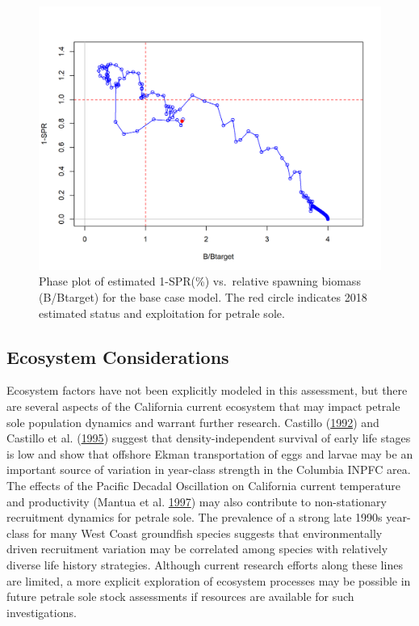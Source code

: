 \documentclass[12pt,]{article}
\begin{document}
\begin{figure}
\centering
\includegraphics{r4ss/plots_mod1/SPR4_phase.png}
\caption{Phase plot of estimated 1-SPR(\%) vs.~relative spawning biomass
(B/Btarget) for the base case model. The red circle indicates 2018
estimated status and exploitation for petrale sole.
\label{fig:Phase_all}}
\end{figure}

\FloatBarrier

\subsection*{Ecosystem Considerations}\label{ecosystem-considerations}

Ecosystem factors have not been explicitly modeled in this assessment,
but there are several aspects of the California current ecosystem that
may impact petrale sole population dynamics and warrant further
research. Castillo
(\protect\hyperlink{ref-castillo_g.c._fluctuations_1992}{1992}) and
Castillo et al.
(\protect\hyperlink{ref-castillo_latitudinal_1995}{1995}) suggest that
density-independent survival of early life stages is low and show that
offshore Ekman transportation of eggs and larvae may be an important
source of variation in year-class strength in the Columbia INPFC area.
The effects of the Pacific Decadal Oscillation on California current
temperature and productivity (Mantua et al.
\protect\hyperlink{ref-mantua_pacific_1997}{1997}) may also contribute
to non-stationary recruitment dynamics for petrale sole. The prevalence
of a strong late 1990s year-class for many West Coast groundfish species
suggests that environmentally driven recruitment variation may be
correlated among species with relatively diverse life history
strategies. Although current research efforts along these lines are
limited, a more explicit exploration of ecosystem processes may be
possible in future petrale sole stock assessments if resources are
available for such investigations.
\end{document}
